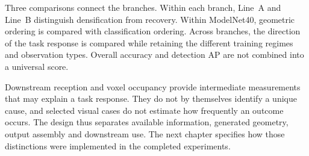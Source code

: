 Three comparisons connect the branches. Within each branch, Line~A and
Line~B distinguish densification from recovery. Within ModelNet40,
geometric ordering is compared with classification ordering. Across
branches, the direction of the task response is compared while retaining
the different training regimes and observation types. Overall accuracy
and detection AP are not combined into a universal score.

Downstream reception and voxel occupancy provide intermediate
measurements that may explain a task response. They do not by themselves
identify a unique cause, and selected visual cases do not estimate how
frequently an outcome occurs. The design thus separates available
information, generated geometry, output assembly and downstream use.
The next chapter specifies how those distinctions were implemented in
the completed experiments.
